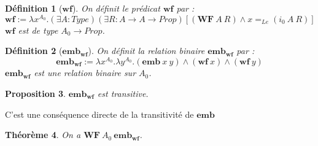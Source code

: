 \documentclass[a4paper,12pt]{article}
\theoremstyle{plain}
\newtheorem{theo}{Théorème}[subsection]
\newtheorem{prop}[theo]{Proposition}
\newtheorem{defi}[theo]{Définition}
\newenvironment{demo}[1][]
 {\if\relax\detokenize{#1}\relax
    \renewcommand\theproofinner{\thetheo}%
  \else
    \renewcommand{\theproofinner}{#1}%
  \fi
  \proofinner}
 {\endproofinner}
\begin{document}
\begin{defi}[$\mathbf{wf}$] On définit le prédicat $\mathbf{wf}$ par :
$$ \mathbf{wf}:= \lambda x^{A_0}. (\exists A : \mathit{Type})(\exists R : A \to A \to \mathit{Prop}) [(\mathbf{WF}\ A \ R) \land  x =_{\mathit{Le}}(i_0 \ A \ R)]$$
$\mathbf{wf}$ est de type $A_0 \to \mathit{Prop}$.
\end{defi}

\begin{defi}[$\mathbf{{emb}_{wf}}$] On définit la relation binaire $\mathbf{{emb}_{wf}}$ par :
$$\mathbf{{emb}_{wf}}:= \lambda x^{A_0}.\lambda y^{A_0}. (\mathbf{emb}\ x \ y) \land (\mathbf{wf}\ x) \land (\mathbf{wf}\ y)$$
$\mathbf{{emb}_{wf}}$ est une relation binaire sur $A_0$.
\end{defi}

\begin{prop}
$\mathbf{{emb}_{wf}}$ est transitive.
\end{prop}

\begin{demo} C'est une conséquence directe de la
transitivité de $\mathbf{emb}$ 
\end{demo}

\begin{theo}
\label{wfA0}
On a $\mathbf{WF}\ A_0 \ \mathbf{{emb}_{wf}}$.
\end{theo}
\end{document}
